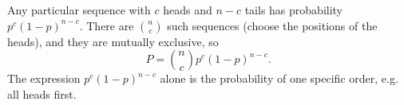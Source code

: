 Any particular sequence with $c$ heads and $n-c$ tails has probability $p^c(1-p)^{n-c}$. There are $\binom nc$ such sequences (choose the positions of the heads), and they are mutually exclusive, so
\[P=\boxed{\binom nc p^c(1-p)^{n-c}}.\]
The expression $p^c(1-p)^{n-c}$ alone is the probability of one specific order, e.g. all heads first.
